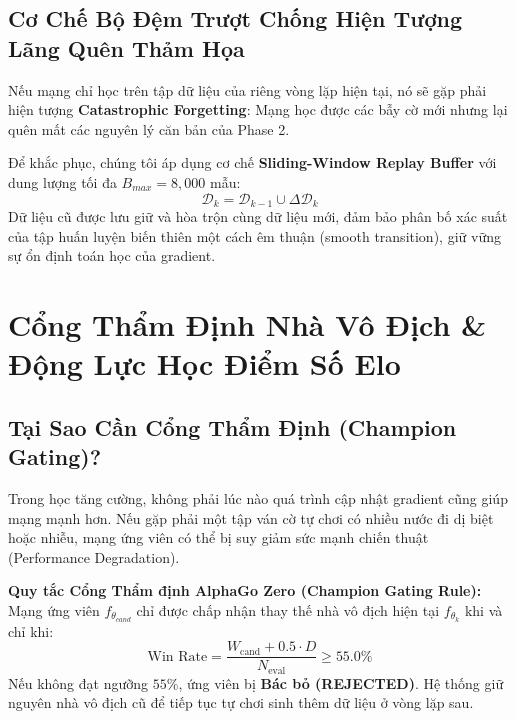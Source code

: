 \documentclass[12pt,a4paper,oneside]{report}
\begin{document}
\section{Cơ Chế Bộ Đệm Trượt Chống Hiện Tượng Lãng Quên Thảm Họa}

Nếu mạng chỉ học trên tập dữ liệu của riêng vòng lặp hiện tại, nó sẽ gặp phải hiện tượng \textbf{Catastrophic Forgetting}: Mạng học được các bẫy cờ mới nhưng lại quên mất các nguyên lý căn bản của Phase 2.

Để khắc phục, chúng tôi áp dụng cơ chế \textbf{Sliding-Window Replay Buffer} với dung lượng tối đa $B_{max} = 8,000$ mẫu:
\begin{equation}
    \mathcal{D}_{k} = \mathcal{D}_{k-1} \cup \Delta \mathcal{D}_{k}
\end{equation}
Dữ liệu cũ được lưu giữ và hòa trộn cùng dữ liệu mới, đảm bảo phân bố xác suất của tập huấn luyện biến thiên một cách êm thuận (smooth transition), giữ vững sự ổn định toán học của gradient.

\chapter{Cổng Thẩm Định Nhà Vô Địch \& Động Lực Học Điểm Số Elo}

\section{Tại Sao Cần Cổng Thẩm Định (Champion Gating)?}

Trong học tăng cường, không phải lúc nào quá trình cập nhật gradient cũng giúp mạng mạnh hơn. Nếu gặp phải một tập ván cờ tự chơi có nhiều nước đi dị biệt hoặc nhiễu, mạng ứng viên có thể bị suy giảm sức mạnh chiến thuật (Performance Degradation).

\begin{definition}
\textbf{Quy tắc Cổng Thẩm định AlphaGo Zero (Champion Gating Rule):}
Mạng ứng viên $f_{\theta_{cand}}$ chỉ được chấp nhận thay thế nhà vô địch hiện tại $f_{\theta_k}$ khi và chỉ khi:
\begin{equation}
    \text{Win Rate} = \frac{W_{\text{cand}} + 0.5 \cdot D}{N_{\text{eval}}} \ge 55.0\%
\end{equation}
Nếu không đạt ngưỡng $55\%$, ứng viên bị \textbf{Bác bỏ (REJECTED)}. Hệ thống giữ nguyên nhà vô địch cũ để tiếp tục tự chơi sinh thêm dữ liệu ở vòng lặp sau.
\end{definition}
\end{document}
